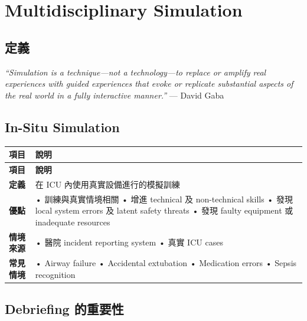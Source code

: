 \documentclass[12pt,a4paper]{article}
\begin{document}
\section{Multidisciplinary Simulation}

\subsection{定義}

\textit{``Simulation is a technique—not a technology—to replace or amplify real experiences with guided experiences that evoke or replicate substantial aspects of the real world in a fully interactive manner.''} — David Gaba

\subsection{In-Situ Simulation}

\begin{longtable}{p{4cm}p{10cm}}
\toprule
\textbf{項目} & \textbf{說明} \\
\midrule
\endfirsthead

\toprule
\textbf{項目} & \textbf{說明} \\
\midrule
\endhead

\bottomrule
\endfoot

\textbf{定義} & 在 ICU 內使用真實設備進行的模擬訓練 \\
\midrule
\textbf{優點} &
• 訓練與真實情境相關\newline
• 增進 technical 及 non-technical skills\newline
• 發現 local system errors 及 latent safety threats\newline
• 發現 faulty equipment 或 inadequate resources \\
\midrule
\textbf{情境來源} &
• 醫院 incident reporting system\newline
• 真實 ICU cases \\
\midrule
\textbf{常見情境} &
• Airway failure\newline
• Accidental extubation\newline
• Medication errors\newline
• Sepsis recognition \\
\bottomrule
\end{longtable}

\subsection{Debriefing 的重要性}
\end{document}
